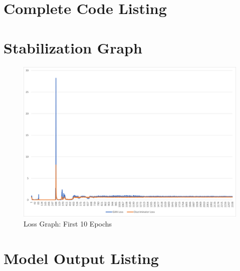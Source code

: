 \documentclass{article}
\begin{document}
\begin{appendices}
\newpage
\section{Complete Code Listing} \label{codelist}

\newpage
\section{Stabilization Graph} \label{graph_app}
\begin{figure}[H]
    \centering
    \includegraphics[width=6in]{csci-8110/hw-4/images/8110_hw4_loss_first_10.png}
    \caption{Loss Graph: First 10 Epochs}
    \label{fig:loss_graph_10}
\end{figure}

\newpage
\section{Model Output Listing} \label{modelouts}


\end{appendices}
\end{document}

